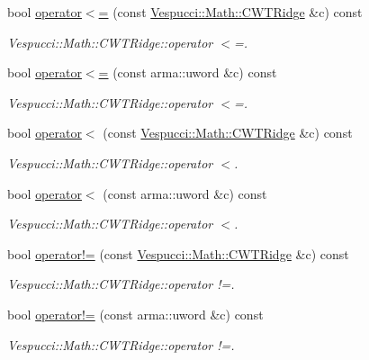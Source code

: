 \begin{DoxyCompactItemize}
bool \hyperlink{class_vespucci_1_1_math_1_1_c_w_t_ridge_a17b2404e6de650c83e2507135673e79f}{operator$<$=} (const \hyperlink{class_vespucci_1_1_math_1_1_c_w_t_ridge}{Vespucci\+::\+Math\+::\+C\+W\+T\+Ridge} \&c) const 
\begin{DoxyCompactList}\small\item\em Vespucci\+::\+Math\+::\+C\+W\+T\+Ridge\+::operator $<$=. \end{DoxyCompactList}\item 
bool \hyperlink{class_vespucci_1_1_math_1_1_c_w_t_ridge_ae1737a4ef81f0190e6d1ef38298b1939}{operator$<$=} (const arma\+::uword \&c) const 
\begin{DoxyCompactList}\small\item\em Vespucci\+::\+Math\+::\+C\+W\+T\+Ridge\+::operator $<$=. \end{DoxyCompactList}\item 
bool \hyperlink{class_vespucci_1_1_math_1_1_c_w_t_ridge_ab20557f5af1df14f9ac2270809c665a6}{operator$<$} (const \hyperlink{class_vespucci_1_1_math_1_1_c_w_t_ridge}{Vespucci\+::\+Math\+::\+C\+W\+T\+Ridge} \&c) const 
\begin{DoxyCompactList}\small\item\em Vespucci\+::\+Math\+::\+C\+W\+T\+Ridge\+::operator $<$. \end{DoxyCompactList}\item 
bool \hyperlink{class_vespucci_1_1_math_1_1_c_w_t_ridge_a16f9b924acb99ce6c5ec97f45545cc3f}{operator$<$} (const arma\+::uword \&c) const 
\begin{DoxyCompactList}\small\item\em Vespucci\+::\+Math\+::\+C\+W\+T\+Ridge\+::operator $<$. \end{DoxyCompactList}\item 
bool \hyperlink{class_vespucci_1_1_math_1_1_c_w_t_ridge_aeef6e998383f31f1e7d2474cf8497c14}{operator!=} (const \hyperlink{class_vespucci_1_1_math_1_1_c_w_t_ridge}{Vespucci\+::\+Math\+::\+C\+W\+T\+Ridge} \&c) const 
\begin{DoxyCompactList}\small\item\em Vespucci\+::\+Math\+::\+C\+W\+T\+Ridge\+::operator !=. \end{DoxyCompactList}\item 
bool \hyperlink{class_vespucci_1_1_math_1_1_c_w_t_ridge_a5b03851ccb32bb6c0eb914721ee96730}{operator!=} (const arma\+::uword \&c) const 
\begin{DoxyCompactList}\small\item\em Vespucci\+::\+Math\+::\+C\+W\+T\+Ridge\+::operator !=. \end{DoxyCompactList}\end{DoxyCompactItemize}


